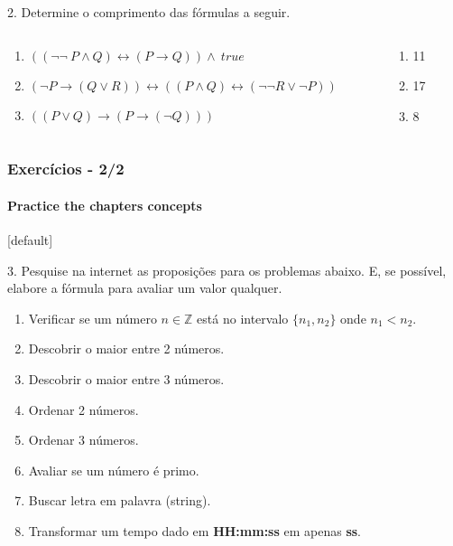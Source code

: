 \begin{frame}[t]
\begin{exampleblock}{2. Determine o comprimento das fórmulas a seguir.}
\begin{columns}[T]
\begin{column}{0.8\textwidth}
                \begin{enumerate}[\bf a.]
                    \item $((\lnot \lnot~P \land Q) \leftrightarrow (P \rightarrow Q)) \land~true$
                    \item $(\lnot P \rightarrow (Q \lor R)) \leftrightarrow ((P \land Q) \leftrightarrow (\lnot \lnot R \lor \lnot P))$
                    \item $((P \lor Q) \rightarrow (P \rightarrow (\lnot Q)))$
                \end{enumerate}
            \end{column}
            \pause
            \begin{column}{0.2\textwidth}
                \begin{enumerate}[\bf a.]
                    \item 11
                    \item 17
                    \item 8
                \end{enumerate}
            \end{column}
        \end{columns}
    \end{exampleblock}
\end{frame}
%
\begin{frame}[t] %
    \frametitle{Exercícios - 2/2}
    \framesubtitle{Practice the chapters concepts}
    \small
    [default]
    \begin{exampleblock}{3. Pesquise na internet as proposições para os problemas abaixo.}
        E, se possível, elabore a fórmula para avaliar um valor qualquer.\\
        \begin{enumerate}[\bf P1.]
            \item Verificar se um número $n \in \mathbb{Z} $ está no intervalo $\{n_1, n_2\}$ onde $n_1 < n_2$.
            \item Descobrir o maior entre 2 números.
            \item Descobrir o maior entre 3 números.
            \item Ordenar 2 números.
            \item Ordenar 3 números.
            \item Avaliar se um número é primo.
            \item Buscar letra em palavra (string).
            \item Transformar um tempo dado em \textbf{HH:mm:ss} em apenas \textbf{ss}.
        \end{enumerate}
    \end{exampleblock}
    \normalsize
    \end{frame}